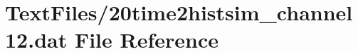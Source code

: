 \hypertarget{20time2histsim__channel12_8dat}{}\section{Text\+Files/20time2histsim\+\_\+channel12.dat File Reference}
\label{20time2histsim__channel12_8dat}
